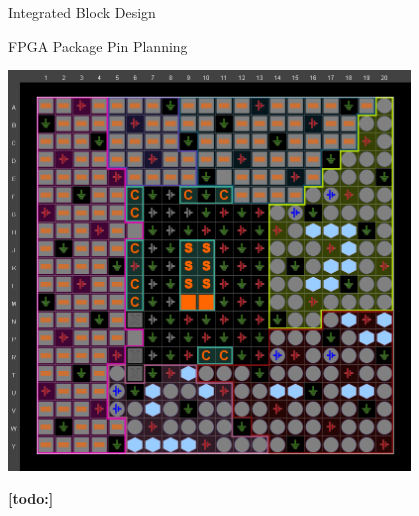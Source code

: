 \documentclass{matthijs}
\begin{document}
\begin{hoofdstuk}{Integrated Block Design}
		\begin{figuur}{FPGA Package Pin Planning}

			\includegraphics[width=0.8\textwidth]{vivado-synth-package.png}

		\end{figuur}

		\textbf{[todo:]}

	\end{hoofdstuk}
\end{document}
